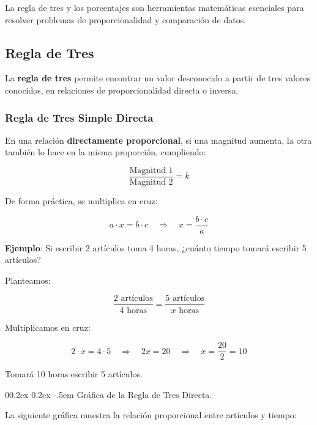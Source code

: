 \documentclass[
  stu,
  floatsintext,
  longtable,
  a4paper,
  nolmodern,
  notxfonts,
  notimes,
  12pt,
  colorlinks=true,linkcolor=blue,citecolor=blue,urlcolor=blue]{apa7}
\makeatletter
\renewcommand{\paragraph}{\@startsection{paragraph}{4}{\parindent}%
	{0\baselineskip \@plus 0.2ex \@minus 0.2ex}%
	{-.5em}%
	{\normalfont\normalsize\bfseries\typesectitle}}
\makeatother
\begin{document}
La regla de tres y los porcentajes son herramientas matemáticas
esenciales para resolver problemas de proporcionalidad y comparación de
datos.

\subsection{Regla de Tres}\label{regla-de-tres}

La \textbf{regla de tres} permite encontrar un valor desconocido a
partir de tres valores conocidos, en relaciones de proporcionalidad
directa o inversa.

\subsubsection{Regla de Tres Simple
Directa}\label{regla-de-tres-simple-directa}

En una relación \textbf{directamente proporcional}, si una magnitud
aumenta, la otra también lo hace en la misma proporción, cumpliendo:

\[
\frac{\text{Magnitud 1}}{\text{Magnitud 2}} = k
\]

De forma práctica, se multiplica en cruz:

\[
a \cdot x = b \cdot c \quad \Rightarrow \quad x = \frac{b \cdot c}{a}
\]

\textbf{Ejemplo}: Si escribir 2 artículos toma 4 horas, ¿cuánto tiempo
tomará escribir 5 artículos?

Planteamos:

\[
\frac{2 \text{ artículos}}{4 \text{ horas}} = \frac{5 \text{ artículos}}{x \text{ horas}}
\]

Multiplicamos en cruz:

\[
2 \cdot x = 4 \cdot 5 \quad \Rightarrow \quad 2x = 20 \quad \Rightarrow \quad x = \frac{20}{2} = 10
\]

Tomará 10 horas escribir 5 artículos.

\paragraph{Gráfica de la Regla de Tres
Directa.}\label{gruxe1fica-de-la-regla-de-tres-directa}

La siguiente gráfica muestra la relación proporcional entre artículos y
tiempo:
\end{document}
